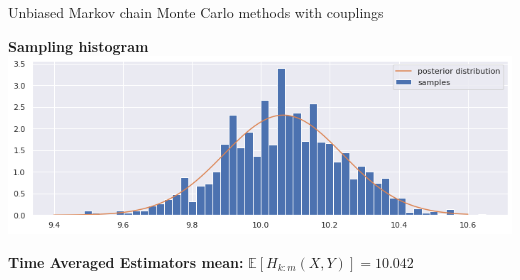 \documentclass{beamer}
\begin{document}
\begin{section}{Unbiased Markov chain Monte Carlo methods with couplings}
\begin{frame}
		\vspace{0.2cm}
	
		\begin{minipage}{0.48\textwidth}
			\begin{center}
				{\scriptsize \textbf{Sampling histogram}}
				\includegraphics[width=\textwidth]{immagini_coupling/hist_coupling}
			\end{center}
		\end{minipage}
		\hfill
		\begin{minipage}{0.48\textwidth}
			\begin{center}
				{\small\textbf{Time Averaged Estimators mean:}}
				$ \mathbb{E}[H_{k:m}(X,Y)] = 10.042$
			\end{center}
		\end{minipage}
		
	\end{frame}
	
\end{section}
\end{document}
